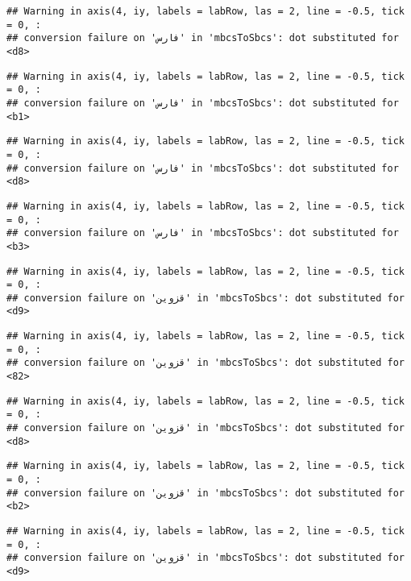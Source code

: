 \documentclass[
]{article}
\begin{document}
\begin{verbatim}
## Warning in axis(4, iy, labels = labRow, las = 2, line = -0.5, tick = 0, :
## conversion failure on 'فارس' in 'mbcsToSbcs': dot substituted for <d8>
\end{verbatim}

\begin{verbatim}
## Warning in axis(4, iy, labels = labRow, las = 2, line = -0.5, tick = 0, :
## conversion failure on 'فارس' in 'mbcsToSbcs': dot substituted for <b1>
\end{verbatim}

\begin{verbatim}
## Warning in axis(4, iy, labels = labRow, las = 2, line = -0.5, tick = 0, :
## conversion failure on 'فارس' in 'mbcsToSbcs': dot substituted for <d8>
\end{verbatim}

\begin{verbatim}
## Warning in axis(4, iy, labels = labRow, las = 2, line = -0.5, tick = 0, :
## conversion failure on 'فارس' in 'mbcsToSbcs': dot substituted for <b3>
\end{verbatim}

\begin{verbatim}
## Warning in axis(4, iy, labels = labRow, las = 2, line = -0.5, tick = 0, :
## conversion failure on 'قزوین' in 'mbcsToSbcs': dot substituted for <d9>
\end{verbatim}

\begin{verbatim}
## Warning in axis(4, iy, labels = labRow, las = 2, line = -0.5, tick = 0, :
## conversion failure on 'قزوین' in 'mbcsToSbcs': dot substituted for <82>
\end{verbatim}

\begin{verbatim}
## Warning in axis(4, iy, labels = labRow, las = 2, line = -0.5, tick = 0, :
## conversion failure on 'قزوین' in 'mbcsToSbcs': dot substituted for <d8>
\end{verbatim}

\begin{verbatim}
## Warning in axis(4, iy, labels = labRow, las = 2, line = -0.5, tick = 0, :
## conversion failure on 'قزوین' in 'mbcsToSbcs': dot substituted for <b2>
\end{verbatim}

\begin{verbatim}
## Warning in axis(4, iy, labels = labRow, las = 2, line = -0.5, tick = 0, :
## conversion failure on 'قزوین' in 'mbcsToSbcs': dot substituted for <d9>
\end{verbatim}
\end{document}
